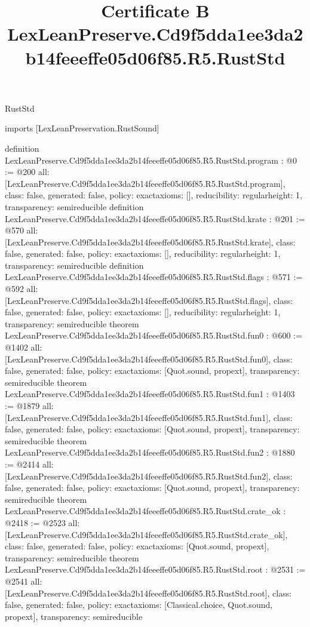\begin{lexlean}{RustStd}
\title{Certificate B LexLeanPreserve.Cd9f5dda1ee3da2b14feeeffe05d06f85.R5.RustStd}
\begin{coremodule}
imports [LexLeanPreservation.RustSound]

definition LexLeanPreserve.Cd9f5dda1ee3da2b14feeeffe05d06f85.R5.RustStd.program : @0 := @200 {
  all: [LexLeanPreserve.Cd9f5dda1ee3da2b14feeeffe05d06f85.R5.RustStd.program],
  class: false,
  generated: false,
  policy: exact{axioms: []},
  reducibility: regular{height: 1},
  transparency: semireducible
}
definition LexLeanPreserve.Cd9f5dda1ee3da2b14feeeffe05d06f85.R5.RustStd.krate : @201 := @570 {
  all: [LexLeanPreserve.Cd9f5dda1ee3da2b14feeeffe05d06f85.R5.RustStd.krate],
  class: false,
  generated: false,
  policy: exact{axioms: []},
  reducibility: regular{height: 1},
  transparency: semireducible
}
definition LexLeanPreserve.Cd9f5dda1ee3da2b14feeeffe05d06f85.R5.RustStd.flags : @571 := @592 {
  all: [LexLeanPreserve.Cd9f5dda1ee3da2b14feeeffe05d06f85.R5.RustStd.flags],
  class: false,
  generated: false,
  policy: exact{axioms: []},
  reducibility: regular{height: 1},
  transparency: semireducible
}
theorem LexLeanPreserve.Cd9f5dda1ee3da2b14feeeffe05d06f85.R5.RustStd.fun0 : @600 := @1402 {
  all: [LexLeanPreserve.Cd9f5dda1ee3da2b14feeeffe05d06f85.R5.RustStd.fun0],
  class: false,
  generated: false,
  policy: exact{axioms: [Quot.sound, propext]},
  transparency: semireducible
}
theorem LexLeanPreserve.Cd9f5dda1ee3da2b14feeeffe05d06f85.R5.RustStd.fun1 : @1403 := @1879 {
  all: [LexLeanPreserve.Cd9f5dda1ee3da2b14feeeffe05d06f85.R5.RustStd.fun1],
  class: false,
  generated: false,
  policy: exact{axioms: [Quot.sound, propext]},
  transparency: semireducible
}
theorem LexLeanPreserve.Cd9f5dda1ee3da2b14feeeffe05d06f85.R5.RustStd.fun2 : @1880 := @2414 {
  all: [LexLeanPreserve.Cd9f5dda1ee3da2b14feeeffe05d06f85.R5.RustStd.fun2],
  class: false,
  generated: false,
  policy: exact{axioms: [Quot.sound, propext]},
  transparency: semireducible
}
theorem LexLeanPreserve.Cd9f5dda1ee3da2b14feeeffe05d06f85.R5.RustStd.crate_ok : @2418 := @2523 {
  all: [LexLeanPreserve.Cd9f5dda1ee3da2b14feeeffe05d06f85.R5.RustStd.crate_ok],
  class: false,
  generated: false,
  policy: exact{axioms: [Quot.sound, propext]},
  transparency: semireducible
}
theorem LexLeanPreserve.Cd9f5dda1ee3da2b14feeeffe05d06f85.R5.RustStd.root : @2531 := @2541 {
  all: [LexLeanPreserve.Cd9f5dda1ee3da2b14feeeffe05d06f85.R5.RustStd.root],
  class: false,
  generated: false,
  policy: exact{axioms: [Classical.choice, Quot.sound, propext]},
  transparency: semireducible
}


\end{coremodule}
\end{lexlean}
